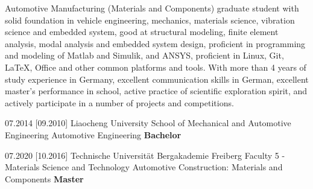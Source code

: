 \documentclass{resume}
\begin{document}
\makeheader

Automotive Manufacturing (Materials and Components) graduate student with solid foundation in vehicle engineering, mechanics, materials science, vibration science and embedded system, good at structural modeling, finite element analysis, modal analysis and embedded system design, proficient in programming and modeling of Matlab and Simulik, and ANSYS,  proficient in Linux, Git, LaTeX, Office and other common platforms and tools. With more than 4 years of study experience in Germany, excellent communication skills in German, excellent master's performance in school, active practice of scientific exploration spirit, and actively participate in a number of projects and competitions.




	\begin{educations}
		\education%
		{07.2014}%
		[09.2010]%
		{Liaocheng University}%
		{School of Mechanical and Automotive Engineering}%
		{Automotive Engineering}%
		{\textbf{Bachelor}}
		
	 \separator{0.1ex}
		
		\education%
		{07.2020}%
		[10.2016]%
		{Technische Universität Bergakademie Freiberg}%
		{Faculty 5 - Materials Science and Technology}%
		{Automotive Construction: Materials and Components}%
		{\textbf{Master}}
	\end{educations}
\end{document}
